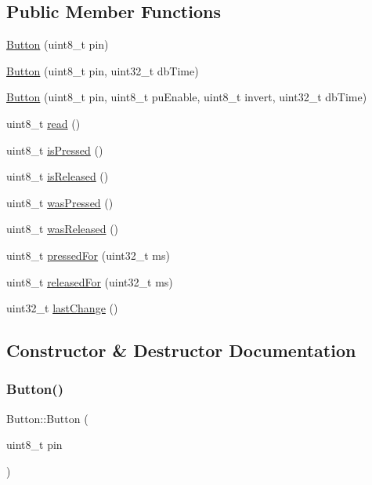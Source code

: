 \subsection*{Public Member Functions}
\begin{DoxyCompactItemize}
\item 
\hyperlink{class_button_a62bf06885bb7e8e8e10320394469142e}{Button} (uint8\+\_\+t pin)
\item 
\hyperlink{class_button_ad61b19bac87236f03f72f5debce40057}{Button} (uint8\+\_\+t pin, uint32\+\_\+t db\+Time)
\item 
\hyperlink{class_button_afed59e35f623f232ae04a892127a0738}{Button} (uint8\+\_\+t pin, uint8\+\_\+t pu\+Enable, uint8\+\_\+t invert, uint32\+\_\+t db\+Time)
\item 
uint8\+\_\+t \hyperlink{class_button_a5f5c0d23ab0e5387b861e68019a7e85d}{read} ()
\item 
uint8\+\_\+t \hyperlink{class_button_adc52c28d5eecbb08818e4a701e346fb0}{is\+Pressed} ()
\item 
uint8\+\_\+t \hyperlink{class_button_a7bf938a70dee91015b044e434fc9499b}{is\+Released} ()
\item 
uint8\+\_\+t \hyperlink{class_button_a3496a1689b2b2f5635d5c7716f38ec43}{was\+Pressed} ()
\item 
uint8\+\_\+t \hyperlink{class_button_a79164a7fd70f08cb8c3930e8c06b9190}{was\+Released} ()
\item 
uint8\+\_\+t \hyperlink{class_button_a11b97b9e73881e876724ddeedac716f9}{pressed\+For} (uint32\+\_\+t ms)
\item 
uint8\+\_\+t \hyperlink{class_button_a805e542eaf9976b7c1afaf3dfecc13a5}{released\+For} (uint32\+\_\+t ms)
\item 
uint32\+\_\+t \hyperlink{class_button_a6880ef962e03d55216d79217e7473bd2}{last\+Change} ()
\end{DoxyCompactItemize}


\subsection{Constructor \& Destructor Documentation}
\mbox{\label{class_button_a62bf06885bb7e8e8e10320394469142e}} 
\subsubsection{\texorpdfstring{Button()}{Button()}\hspace{0.1cm}{\footnotesize\ttfamily [1/3]}}
{\footnotesize\ttfamily Button\+::\+Button (\begin{DoxyParamCaption}\item[{uint8\+\_\+t}]{pin }\end{DoxyParamCaption})}

